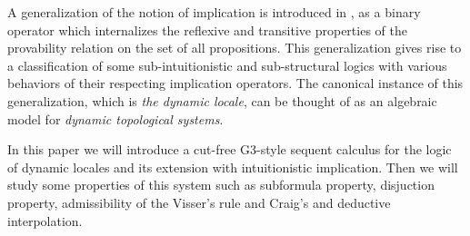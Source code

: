 A generalization of the notion of implication is introduced in \cite{amir}, as a binary operator which internalizes the reflexive and transitive properties of the provability relation on the set of all propositions. This generalization gives rise to a classification of some sub-intuitionistic and sub-structural logics with various behaviors of their respecting implication operators. The canonical instance of this generalization, which is \emph{the dynamic locale}, can be thought of as an algebraic model for \emph{dynamic topological systems}.

In this paper we will introduce a cut-free G3-style sequent calculus for the logic of dynamic locales and its extension with intuitionistic implication. Then we will study some properties of this system such as subformula property, disjuction property, admissibility of the Visser's rule and Craig's and deductive interpolation.